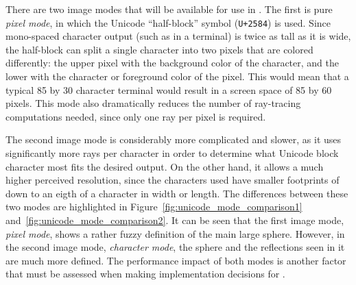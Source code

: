 There are two image modes that will be available for use in \name.
The first is pure {\it pixel mode}, in which the Unicode ``half-block'' symbol (\texttt{U+2584}) is used.
Since mono-spaced character output (such as in a terminal) is twice as tall as it is wide, the half-block can split a single character into two pixels that are colored differently: the upper pixel with the background color of the character, and the lower with the character or foreground color of the pixel.
This would mean that a typical 85 by 30 character terminal would result in a screen space of 85 by 60 pixels.
This mode also dramatically reduces the number of ray-tracing computations needed, since only one ray per pixel is required.

The second image mode is considerably more complicated and slower, as it uses significantly more rays per character in order to determine what Unicode block character most fits the desired output.
On the other hand, it allows a much higher perceived resolution, since the characters used have smaller footprints of down to an eigth of a character in width or length.
The differences between these two modes are highlighted in Figure~\ref{fig:unicode_mode_comparison1} and~\ref{fig:unicode_mode_comparison2}.
It can be seen that the first image mode, {\it pixel mode}, shows a rather fuzzy definition of the main large sphere.
However, in the second image mode, {\it character mode}, the sphere and the reflections seen in it are much more defined.
The performance impact of both modes is another factor that must be assessed when making implementation decisions for \name.

